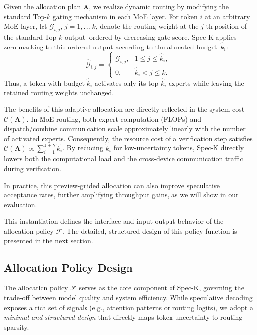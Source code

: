 \documentclass[conference]{IEEEtran}
\theoremstyle{definition} %
\begin{document}
Given the allocation plan $\mathbf{A}$, we realize dynamic routing by modifying the standard Top-$k$ gating mechanism in each MoE layer. For token $i$ at an arbitrary MoE layer, let $\mathcal{G}_{i,j}$, $j=1,\dots,k$, denote the routing weight at the $j$-th position of the standard Top-$k$ output, ordered by decreasing gate score. Spec-K applies zero-masking to this ordered output according to the allocated budget~$\hat k_i$:
\begin{equation}
\hat{\mathcal{G}}_{i,j} =
\begin{cases}
\mathcal{G}_{i,j}, & 1\le j\le\hat{k}_i,\\
0, & \hat{k}_i<j\le k.
\end{cases}
\end{equation}
Thus, a token with budget $\hat k_i$ activates only its top $\hat k_i$ experts while leaving the retained routing weights unchanged.

The benefits of this adaptive allocation are directly reflected in the system cost $\mathcal{C}(\mathbf{A})$.
In MoE routing, both expert computation (FLOPs) and dispatch/combine communication scale approximately linearly with the number of activated experts.
Consequently, the resource cost of a verification step satisfies $\mathcal{C}(\mathbf{A}) \propto \sum_{i=1}^{1+\gamma} \hat k_i$.
By reducing $\hat k_i$ for low-uncertainty tokens, Spec-K directly lowers both the computational load and the cross-device communication traffic during verification.

In practice, this preview-guided allocation can also improve speculative acceptance 
rates, further amplifying throughput gains, as we will show in our evaluation.

This instantiation defines the interface and input-output behavior of the allocation policy $\mathcal{F}$.
The detailed, structured design of this policy function is presented in the next section.

\subsection{Allocation Policy Design} \label{sec:method:policy}

The allocation policy $\mathcal{F}$ serves as the core component of Spec-K, governing the trade-off between model quality and system efficiency.
While speculative decoding exposes a rich set of signals (e.g., attention patterns or routing logits), we adopt a \emph{minimal and structured design} that directly maps token uncertainty to routing sparsity.
\end{document}
